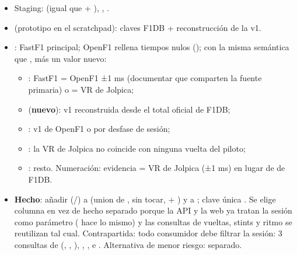 \begin{itemize}
\item Staging:  (igual que  + ), , .
\item {} (prototipo en el scratchpad): claves F1DB + reconstrucción de la v1.
\item {}: FastF1 principal; OpenF1 rellena tiempos nulos ();  con la misma semántica que , más un valor nuevo:
\begin{itemize}
\item {}: FastF1 = OpenF1 ±1 ms (documentar que comparten la fuente primaria) o = VR de Jolpica;
\item {} (\textbf{nuevo}): v1 reconstruida desde el total oficial de F1DB;
\item {}: v1 de OpenF1 o por desfase de sesión;
\item {}: la VR de Jolpica no coincide con ninguna vuelta del piloto;
\item {}: resto. Numeración: evidencia = VR de Jolpica (±1 ms) en lugar de  de F1DB.
\end{itemize}
\item \textbf{Hecho}: añadir  (/) a  (union de , sin tocar, + ) y a ; clave única . Se elige columna en vez de hecho separado porque la API y la web ya tratan la sesión como parámetro ( hace lo mismo) y las consultas de vueltas, stints y ritmo se reutilizan tal cual. Contrapartida: todo consumidor debe filtrar la sesión: 3 consultas de  (, , ), , ,  e . Alternativa de menor riesgo:  separado.

\end{itemize}

